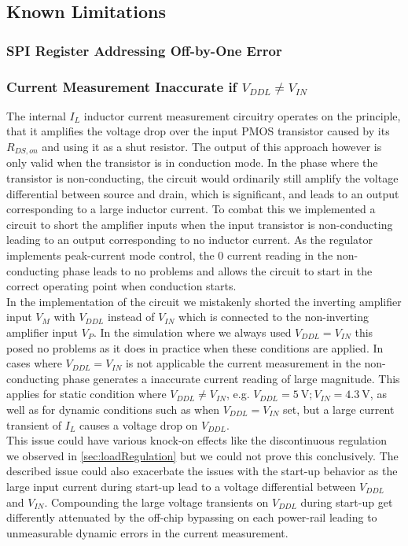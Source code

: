 \subsection{Known Limitations}

\subsubsection{SPI Register Addressing Off-by-One Error}

\subsubsection{Current Measurement Inaccurate if $V_{DDL} \neq V_{IN}$}

The internal $I_L$ inductor current measurement circuitry operates on the principle, that it amplifies the voltage drop over the input PMOS transistor caused by its $R_{DS,on}$ and using it as a shut resistor. The output of this approach however is only valid when the transistor is in conduction mode. In the phase where the transistor is non-conducting, the circuit would ordinarily still amplify the voltage differential between source and drain, which is significant, and leads to an output corresponding to a large inductor current. To combat this we implemented a circuit to short the amplifier inputs when the input transistor is non-conducting leading to an output corresponding to no inductor current. As the regulator implements peak-current mode control, the 0 current reading in the non-conducting phase leads to no problems and allows the circuit to start in the correct operating point when conduction starts. \\
In the implementation of the circuit we mistakenly shorted the inverting amplifier input $V_M$ with $V_{DDL}$ instead of $V_{IN}$ which is connected to the non-inverting amplifier input $V_P$. In the simulation where we always used $V_{DDL} = V_{IN}$ this posed no problems as it does in practice when these conditions are applied. In cases where $V_{DDL} = V_{IN}$ is not applicable the current measurement in the non-conducting phase generates a inaccurate current reading of large magnitude. This applies for static condition where $V_{DDL} \neq V_{IN}$, e.g. $V_{DDL} = \qty{5}{\volt}; V_{IN}= \qty{4.3}{\volt}$, as well as for dynamic conditions such as when $V_{DDL} = V_{IN}$ set, but a large current transient of $I_L$ causes a voltage drop on $V_{DDL}$.\\
This issue could have various knock-on effects like the discontinuous regulation we observed in \autoref{sec:loadRegulation} but we could not prove this conclusively. The described issue could also exacerbate the issues with the start-up behavior as the large input current during start-up lead to a voltage differential between $V_{DDL}$ and $V_{IN}$. Compounding the large voltage transients on $V_{DDL}$ during start-up get differently attenuated by the off-chip bypassing on each power-rail leading to unmeasurable dynamic errors in the current measurement.

